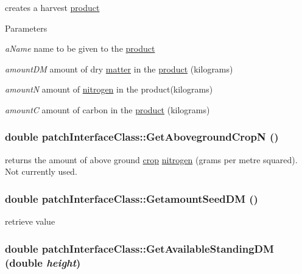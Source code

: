 creates a harvest \hyperlink{classproduct}{product} 
\begin{DoxyParams}{Parameters}
\item[{\em aName}]name to be given to the \hyperlink{classproduct}{product} \item[{\em amountDM}]amount of dry \hyperlink{classmatter}{matter} in the \hyperlink{classproduct}{product} (kilograms) \item[{\em amountN}]amount of \hyperlink{classnitrogen}{nitrogen} in the product(kilograms) \item[{\em amountC}]amount of carbon in the \hyperlink{classproduct}{product} (kilograms) \end{DoxyParams}
\hypertarget{classpatch_interface_class_a14e6aed7da3189e045f0ed4e6b0afbad}{
\subsubsection[{GetAbovegroundCropN}]{\setlength{\rightskip}{0pt plus 5cm}double patchInterfaceClass::GetAbovegroundCropN ()}}
\label{classpatch_interface_class_a14e6aed7da3189e045f0ed4e6b0afbad}


returns the amount of above ground \hyperlink{classcrop}{crop} \hyperlink{classnitrogen}{nitrogen} (grams per metre squared). Not currently used. \hypertarget{classpatch_interface_class_a49a343736a61c4f719aee6285086726c}{
\subsubsection[{GetamountSeedDM}]{\setlength{\rightskip}{0pt plus 5cm}double patchInterfaceClass::GetamountSeedDM ()}}
\label{classpatch_interface_class_a49a343736a61c4f719aee6285086726c}


retrieve value \hypertarget{classpatch_interface_class_aeed4d997725c93a172c2bf3e12916ce7}{
\subsubsection[{GetAvailableStandingDM}]{\setlength{\rightskip}{0pt plus 5cm}double patchInterfaceClass::GetAvailableStandingDM (double {\em height})}}
\label{classpatch_interface_class_aeed4d997725c93a172c2bf3e12916ce7}


